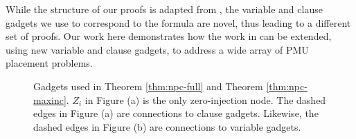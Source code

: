 
While the structure of our proofs is adapted from \cite{Brueni05}, the variable and clause gadgets we use to correspond to the \sat formula are novel, thus leading to a 
different set of proofs. Our work here demonstrates how the work in \cite{Brueni05} can be extended, using new variable and clause gadgets, to address a wide array of PMU placement problems.



\begin{figure}[t]
	\caption{Gadgets used in Theorem \ref{thm:npc-full} and Theorem \ref{thm:npc-maxinc}. $Z_i$ in Figure (a) is the only zero-injection node. The dashed edges in Figure (a) are connections to clause gadgets.  Likewise, the dashed edges in Figure (b) are connections to variable gadgets. }
  \label{fig:maxinc}
\end{figure}




